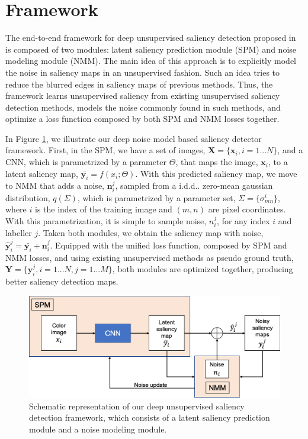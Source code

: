 \documentclass{article}
\makeatletter
\DeclareRobustCommand\onedot{\futurelet\@let@token\@onedot}
\def\@onedot{\ifx\@let@token.\else.\null\fi\xspace}
\def\idd{i.d.d\onedot}
\makeatother
\begin{document}
\section{Framework}

The end-to-end framework for deep unsupervised saliency detection proposed in \cite{zhang2018} is composed of two modules: latent saliency prediction module (SPM) and noise modeling module (NMM). The main idea of this approach is to explicitly model the noise in saliency maps in an unsupervised fashion. Such an idea tries to reduce the blurred edges in saliency maps of previous methods. Thus, the framework learns unsupervised saliency from existing unsupervised saliency detection methods, models the noise commonly found in such methods, and optimize a loss function composed by both SPM and NMM losses together.

In Figure \ref{fig:scheme}, we illustrate our deep noise model based saliency detector framework. First, in the SPM, we have a set of images, $\boldsymbol{X} = \{\boldsymbol{x}_i, i = 1...N\}$, and a CNN, which is parametrized by a parameter $\Theta$, that maps the image, $\boldsymbol{x}_i$, to a latent saliency map, $\bar{\boldsymbol{y}_i} = f(x_i; \Theta)$. With this predicted saliency map, we move to NMM that adds a noise, $\boldsymbol{n}^{j}_i$, sampled from a \idd zero-mean gaussian distribution, $q(\Sigma)$, which is parametrized by a parameter set, $\Sigma = \{\sigma_{mn}^i\}$, where $i$ is the index of the training image and $(m, n)$ are pixel coordinates. With this parametrization, it is simple to sample noise, $n_i^j$, for any index $i$ and labeller $j$. Taken both modules, we obtain the saliency map with noise, $\boldsymbol{\hat{y}}_i^{j} = \bar{\boldsymbol{y}_i} + \boldsymbol{n}^{j}_i$. Equipped with the unified loss function, composed by SPM and NMM losses, and using existing unsupervised methods as pseudo ground truth, $\boldsymbol{Y} = \{\boldsymbol{y}_i^{j}, i = 1...N, j = 1...M\}$, both modules are optimized together, producing better saliency detection maps.

\begin{figure}[h]
  \centering
  \includegraphics[width=0.8\linewidth]{fig1.png}
  \caption{Schematic representation of our deep unsupervised saliency detection framework, which consists of a latent saliency prediction module and a noise modeling module.}
  \label{fig:scheme}
\end{figure}
\end{document}
